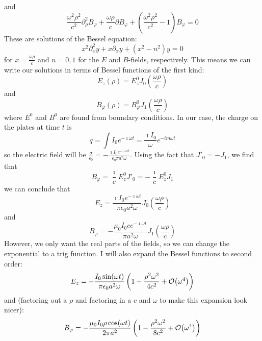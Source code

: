 \documentclass[a4paper,twoside]{article}
\begin{document}
\begin{problem}
\begin{equation}
    \end{equation}
    and
    \begin{equation}
        \frac{\omega^2 \rho^2}{c^2} \partial^2_{\rho} B_{\varphi} + \frac{\omega \rho}{c} \partial B_{\varphi} + \left( \frac{\omega^2 \rho^2}{c^2} - 1 \right) B_{\varphi} = 0
    \end{equation}
    These are solutions of the Bessel equation:
    \begin{equation}
        x^2 \partial^2_x y + x \partial_x y + (x^2 - n^2)y = 0
    \end{equation}
    for $ x = \frac{\omega \rho}{c} $ and $ n = 0,1 $ for the $ E $ and $ B $-fields, respectively. This means we can write our solutions in terms of Bessel functions of the first kind:
    \begin{equation}
        E_z(\rho) = E_z^0 J_0 \left( \frac{\omega \rho}{c} \right)
    \end{equation}
    and
    \begin{equation}
        B_{\varphi}(\rho) = B_{\varphi}^0 J_1 \left( \frac{\omega \rho}{c} \right)
    \end{equation}
    where $ E^0 $ and $ B^0 $ are found from boundary conditions. In our case, the charge on the plates at time $ t $ is
    \begin{equation}
        q = \int I_0 e^{- \imath \omega t} = \frac{\imath I_0}{\omega} e^{-im \omega t}
    \end{equation}
    so the electric field will be $ \frac{\sigma}{\epsilon_0} = -\frac{\imath I_0 e^{- \imath \omega t}}{\epsilon_0 \pi a^2 \omega} $. Using the fact that $ J'_0 = - J_1 $, we find that
    \begin{equation}
        B_{\varphi} = \frac{\imath}{c} E^0_z J'_0 = - \frac{\imath}{c} E^0_z J_1
    \end{equation}
    we can conclude that
    \begin{equation}
        E_z = \frac{\imath I_0 e^{- \imath \omega t}}{\pi \epsilon_0 a^2 \omega} J_0 \left( \frac{\omega \rho}{c} \right)
    \end{equation}
    and
    \begin{equation}
        B_{\varphi} = - \frac{\mu_0 I_0 c e^{- \imath \omega t}}{\pi a^2 \omega} J_1 \left( \frac{\omega \rho}{c} \right)
    \end{equation}
    However, we only want the real parts of the fields, so we can change the exponential to a trig function. I will also expand the Bessel functions to second order:
    \begin{equation}
        E_z = - \frac{I_0 \sin(\omega t)}{\pi \epsilon_0 a^2 \omega} \left( 1 - \frac{\rho^2 \omega^2}{4 c^2} + \order{\omega^4} \right)
    \end{equation}
    and (factoring out a $\rho$ and factoring in a $ c $ and $ \omega $ to make this expansion look nicer):
    \begin{equation}
        B_{\varphi} = - \frac{\mu_0 I_0 \rho \cos(\omega t)}{2 \pi a^2} \left( 1 - \frac{\rho^2 \omega^2}{8 c^2} + \order{\omega^4} \right)
    \end{equation}
\end{problem}
\end{document}
